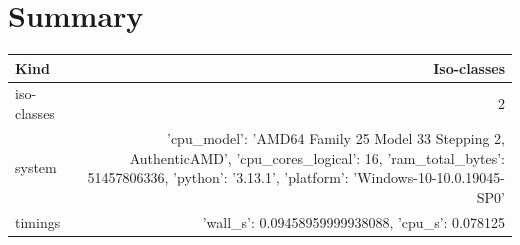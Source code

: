 \documentclass[11pt]{article}
\begin{document}
\section*{Summary}
\begin{tabular}{lr}
\toprule
Kind & Iso-classes\\\midrule
iso-classes & 2\\
system & {'cpu_model': 'AMD64 Family 25 Model 33 Stepping 2, AuthenticAMD', 'cpu_cores_logical': 16, 'ram_total_bytes': 51457806336, 'python': '3.13.1', 'platform': 'Windows-10-10.0.19045-SP0'}\\
timings & {'wall_s': 0.09458959999938088, 'cpu_s': 0.078125}\\
\bottomrule
\end{tabular}
\end{document}
